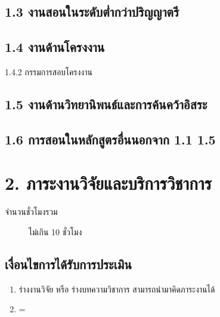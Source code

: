 \documentclass[a4paper,12pt,english]{sphinxmanual}
\begin{document}
\section{1.3 งานสอนในระดับต่ำกว่าปริญญาตรี}
\label{\detokenize{1teaching:id8}}

\section{1.4 งานด้านโครงงาน}
\label{\detokenize{1teaching:id9}}
1.4.2 กรรมการสอบโครงงาน


\section{1.5 งานด้านวิทยานิพนธ์และการค้นคว้าอิสระ}
\label{\detokenize{1teaching:id10}}

\section{1.6 การสอนในหลักสูตรอื่นนอกจาก 1.1 \sphinxhyphen{} 1.5}
\label{\detokenize{1teaching:id11}}

\chapter{2. ภาระงานวิจัยและบริการวิชาการ}
\label{\detokenize{2research:id1}}\label{\detokenize{2research::doc}}\begin{description}
\item[{จำนวนชั่วโมงรวม}] \leavevmode
ไม่เกิน 10 ชั่วโมง

\end{description}


\section{เงื่อนไขการได้รับการประเมิน}
\label{\detokenize{2research:id2}}\begin{enumerate}
%
\item {} 
ร่างงานวิจัย หรือ ร่างบทความวิชาการ  สามารถนำมาคิดภาระงานได้

\item {} 
=

\end{enumerate}
\end{document}
